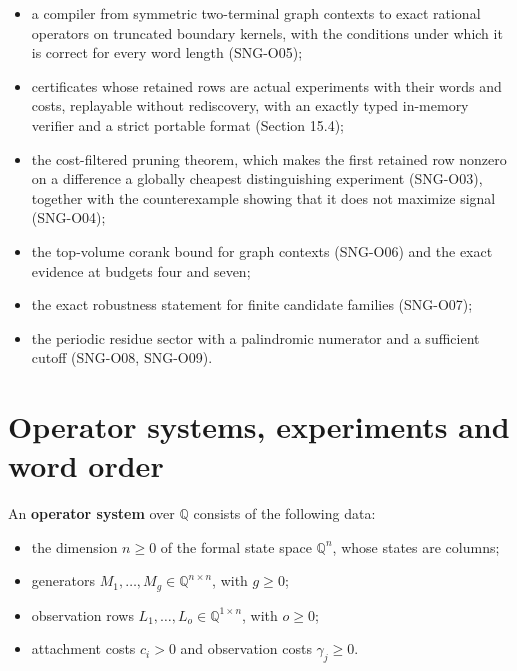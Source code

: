 \documentclass[
  11pt,
  a4paper,
]{report}
\providecommand{\tightlist}{%
  \setlength{\itemsep}{0pt}\setlength{\parskip}{0pt}}
\begin{document}
\begin{itemize}
\tightlist
\item
  a compiler from symmetric two-terminal graph contexts to exact
  rational operators on truncated boundary kernels, with the conditions
  under which it is correct for every word length (SNG-O05);
\item
  certificates whose retained rows are actual experiments with their
  words and costs, replayable without rediscovery, with an exactly typed
  in-memory verifier and a strict portable format (Section 15.4);
\item
  the cost-filtered pruning theorem, which makes the first retained row
  nonzero on a difference a globally cheapest distinguishing experiment
  (SNG-O03), together with the counterexample showing that it does not
  maximize signal (SNG-O04);
\item
  the top-volume corank bound for graph contexts (SNG-O06) and the exact
  evidence at budgets four and seven;
\item
  the exact robustness statement for finite candidate families
  (SNG-O07);
\item
  the periodic residue sector with a palindromic numerator and a
  sufficient cutoff (SNG-O08, SNG-O09).
\end{itemize}

\hypertarget{operator-systems-experiments-and-word-order}{%
\section{Operator systems, experiments and word
order}\label{operator-systems-experiments-and-word-order}}

An \textbf{operator system} over \(\mathbb Q\) consists of the following
data:

\begin{itemize}
\tightlist
\item
  the dimension \(n\ge0\) of the formal state space \(\mathbb Q^n\),
  whose states are columns;
\item
  generators \(M_1,\ldots,M_g\in\mathbb Q^{n\times n}\), with \(g\ge0\);
\item
  observation rows \(L_1,\ldots,L_o\in\mathbb Q^{1\times n}\), with
  \(o\ge0\);
\item
  attachment costs \(c_i>0\) and observation costs \(\gamma_j\ge0\).
\end{itemize}
\end{document}
